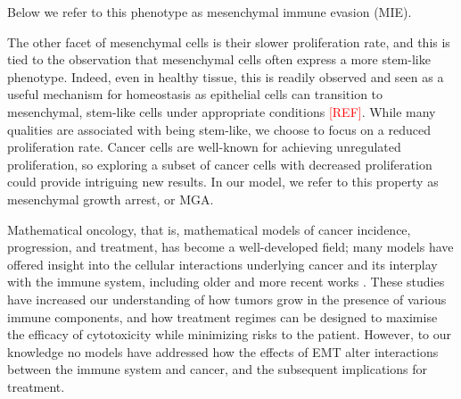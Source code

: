 \documentclass[11pt]{article}
\newcommand{\tcr} { \textcolor{red} }
\begin{document}
Below we refer to this phenotype as mesenchymal immune evasion (MIE).
\par
The other facet of mesenchymal cells is their slower proliferation rate, and this is tied to the observation that mesenchymal cells often express a more stem-like phenotype.
Indeed, even in healthy tissue, this is readily observed and seen as a useful mechanism for homeostasis as epithelial cells can transition to mesenchymal, stem-like cells under appropriate conditions \tcr{[REF]}.
While many qualities are associated with being stem-like, we choose to focus on a reduced proliferation rate\cite{woods2014effects}.
Cancer cells are well-known for achieving unregulated proliferation, so exploring a subset of cancer cells with decreased proliferation could provide intriguing new results.
In our model, we refer to this property as mesenchymal growth arrest, or MGA.
\par
Mathematical oncology, that is, mathematical models of cancer incidence, progression, and treatment, has become a well-developed field; many models have offered insight into the cellular interactions underlying cancer and its interplay with the immune system, including older \cite{sherrattjonathana.92_oncogenes, pillis05_validated} and more recent works \cite{an15_agentbased, serre16_mathematical, louzoun14_mathematical, benzekry17_mathematical, west19_immune, owen11_mathematical-1}. These studies have increased our understanding of how tumors grow in the presence of various immune components, and how treatment regimes can be designed to maximise the efficacy of cytotoxicity while minimizing risks to the patient. However, to our knowledge no models have addressed how the effects of EMT alter interactions between the immune system and cancer, and the subsequent implications for treatment. 
\par
\end{document}
